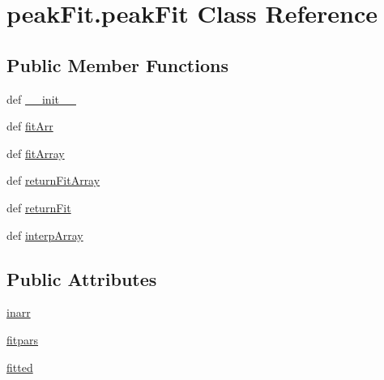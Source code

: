 \hypertarget{classpeak_fit_1_1peak_fit}{\section{peak\-Fit.\-peak\-Fit Class Reference}
\label{classpeak_fit_1_1peak_fit}
}
\subsection*{Public Member Functions}
\begin{DoxyCompactItemize}
\item 
def \hyperlink{classpeak_fit_1_1peak_fit_a6ab39ce33c91775176e0c46cc6f936f6}{\-\_\-\-\_\-init\-\_\-\-\_\-}
\item 
def \hyperlink{classpeak_fit_1_1peak_fit_a84a91a33d88ca2403a4e435b5d1f90ec}{fit\-Arr}
\item 
def \hyperlink{classpeak_fit_1_1peak_fit_a0bbfae3ae35fbad87477c06b1607362a}{fit\-Array}
\item 
def \hyperlink{classpeak_fit_1_1peak_fit_a4be5cc7b519e08cd3c401e44449ff06b}{return\-Fit\-Array}
\item 
def \hyperlink{classpeak_fit_1_1peak_fit_ad2af816ebe4e711d783eac36caf062fd}{return\-Fit}
\item 
def \hyperlink{classpeak_fit_1_1peak_fit_a430b52fc42d7539b1374dc4bd1b64efc}{interp\-Array}
\end{DoxyCompactItemize}
\subsection*{Public Attributes}
\begin{DoxyCompactItemize}
\item 
\hyperlink{classpeak_fit_1_1peak_fit_a46bbd242120c1eb44158673fc1ba69eb}{inarr}
\item 
\hyperlink{classpeak_fit_1_1peak_fit_a7bcef9f3d5dbca4a5470a53661dabe4c}{fitpars}
\item 
\hyperlink{classpeak_fit_1_1peak_fit_a1d06c78ecd07718ae71cc50df4d0251c}{fitted}
\end{DoxyCompactItemize}


